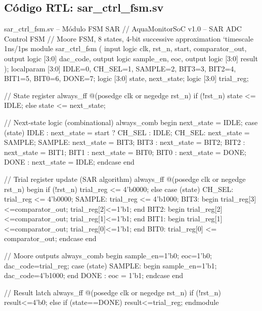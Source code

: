 \documentclass[12pt,a4paper]{article}
\begin{document}
\subsection{Código RTL: sar\_ctrl\_fsm.sv}

\begin{svcode}{sar\_ctrl\_fsm.sv -- Módulo FSM SAR}
// AquaMonitorSoC v1.0 -- SAR ADC Control FSM
// Moore FSM, 8 states, 4-bit successive approximation
`timescale 1ns/1ps
module sar_ctrl_fsm (
    input  logic        clk, rst_n, start, comparator_out,
    output logic [3:0]  dac_code,
    output logic        sample_en, eoc,
    output logic [3:0]  result
);
    localparam [3:0] IDLE=0, CH_SEL=1, SAMPLE=2,
                     BIT3=3, BIT2=4, BIT1=5, BIT0=6, DONE=7;
    logic [3:0] state, next_state;
    logic [3:0] trial_reg;

    // State register
    always_ff @(posedge clk or negedge rst_n)
        if (!rst_n) state <= IDLE; else state <= next_state;

    // Next-state logic (combinational)
    always_comb begin
        next_state = IDLE;
        case (state)
            IDLE  : next_state = start ? CH_SEL : IDLE;
            CH_SEL: next_state = SAMPLE;
            SAMPLE: next_state = BIT3;
            BIT3  : next_state = BIT2;
            BIT2  : next_state = BIT1;
            BIT1  : next_state = BIT0;
            BIT0  : next_state = DONE;
            DONE  : next_state = IDLE;
        endcase
    end

    // Trial register update (SAR algorithm)
    always_ff @(posedge clk or negedge rst_n) begin
        if (!rst_n) trial_reg <= 4'b0000;
        else case (state)
            CH_SEL: trial_reg <= 4'b0000;
            SAMPLE: trial_reg <= 4'b1000;
            BIT3: begin trial_reg[3]<=comparator_out; trial_reg[2]<=1'b1; end
            BIT2: begin trial_reg[2]<=comparator_out; trial_reg[1]<=1'b1; end
            BIT1: begin trial_reg[1]<=comparator_out; trial_reg[0]<=1'b1; end
            BIT0: trial_reg[0] <= comparator_out;
        endcase
    end

    // Moore outputs
    always_comb begin
        sample_en=1'b0; eoc=1'b0; dac_code=trial_reg;
        case (state)
            SAMPLE: begin sample_en=1'b1; dac_code=4'b1000; end
            DONE  : eoc = 1'b1;
        endcase
    end

    // Result latch
    always_ff @(posedge clk or negedge rst_n)
        if (!rst_n) result<=4'b0; else if (state==DONE) result<=trial_reg;
endmodule
\end{svcode}
\end{document}
